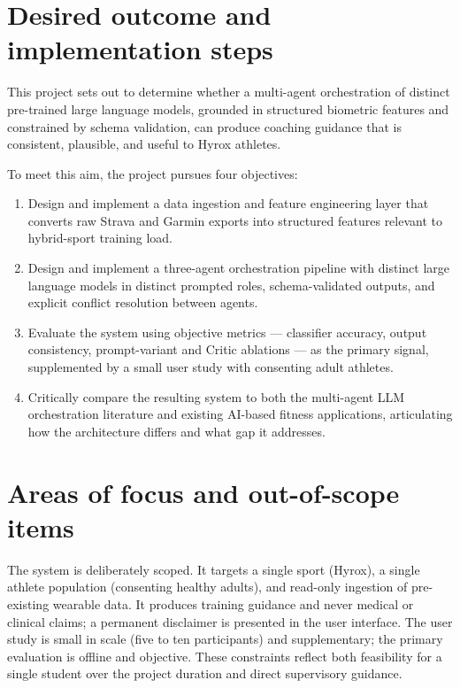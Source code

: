 \section{Desired outcome and implementation steps}

This project sets out to determine whether a multi-agent orchestration of distinct pre-trained large language models, grounded in structured biometric features and constrained by schema validation, can produce coaching guidance that is consistent, plausible, and useful to Hyrox athletes.

To meet this aim, the project pursues four objectives:

\begin{enumerate}
  \item Design and implement a data ingestion and feature engineering layer that converts raw Strava and Garmin exports into structured features relevant to hybrid-sport training load.
  \item Design and implement a three-agent orchestration pipeline with distinct large language models in distinct prompted roles, schema-validated outputs, and explicit conflict resolution between agents.
  \item Evaluate the system using objective metrics --- classifier accuracy, output consistency, prompt-variant and Critic ablations --- as the primary signal, supplemented by a small user study with consenting adult athletes.
  \item Critically compare the resulting system to both the multi-agent LLM orchestration literature and existing AI-based fitness applications, articulating how the architecture differs and what gap it addresses.
\end{enumerate}

\section{Areas of focus and out-of-scope items}

The system is deliberately scoped. It targets a single sport (Hyrox), a single athlete population (consenting healthy adults), and read-only ingestion of pre-existing wearable data. It produces training guidance and never medical or clinical claims; a permanent disclaimer is presented in the user interface. The user study is small in scale (five to ten participants) and supplementary; the primary evaluation is offline and objective. These constraints reflect both feasibility for a single student over the project duration and direct supervisory guidance.

